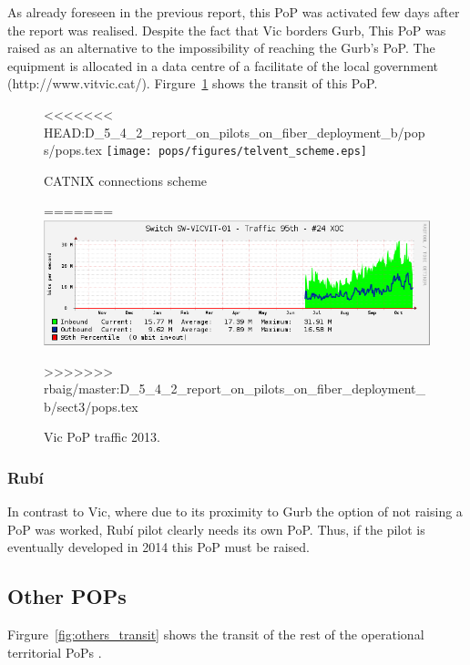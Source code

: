 As already foreseen in the previous report, this PoP was activated few days after the report was realised. Despite the fact that Vic borders Gurb, This PoP was raised as an alternative to the impossibility of reaching the Gurb's PoP. The equipment is allocated in a data centre of a facilitate of the local government (http://www.vitvic.cat/). Firgure~\ref{fig:vic_transit} shows the transit of this PoP.

\begin{figure}[H]
  \centering
<<<<<<< HEAD:D_5_4_2_report_on_pilots_on_fiber_deployment_b/pops/pops.tex
  \texttt{[image: pops/figures/telvent\_scheme.eps]} 
  \caption{CATNIX connections scheme}
  \label{fig:telvent_scheme}
=======
  \includegraphics[width=0.95\linewidth]{sect3/figures/vic.png} 
  \caption[Vic PoP traffic 2013]{Vic PoP traffic 2013.}
  \label{fig:vic_transit}
>>>>>>> rbaig/master:D_5_4_2_report_on_pilots_on_fiber_deployment_b/sect3/pops.tex
\end{figure}


\FloatBarrier
\subsubsection{Rub\'{i}}
\label{pop_rubi}

In contrast to Vic, where due to its proximity to Gurb the option of not raising a PoP was worked, Rubí pilot clearly needs its own PoP. Thus, if the pilot is eventually developed in 2014 this PoP must be raised.


\FloatBarrier
\subsection{Other POPs}
\label{pop_others}

Firgure~\ref{fig:others_transit} shows the transit of the rest of the operational territorial PoPs .


